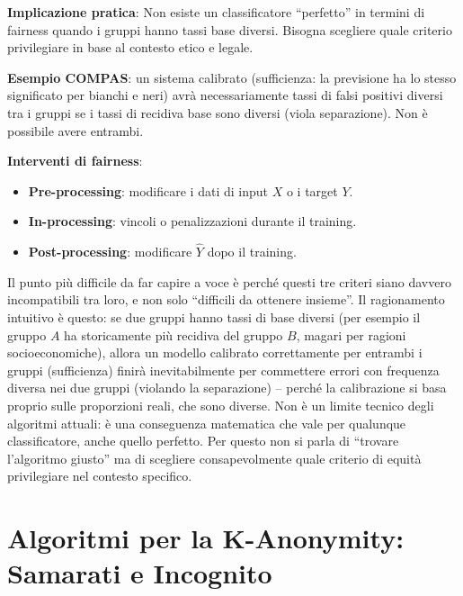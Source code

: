 \documentclass[a4paper,11pt]{article}
\begin{document}
\textbf{Implicazione pratica}: Non esiste un classificatore ``perfetto'' in termini di fairness quando i gruppi hanno tassi base diversi. Bisogna scegliere quale criterio privilegiare in base al contesto etico e legale.

\textbf{Esempio COMPAS}: un sistema calibrato (sufficienza: la previsione ha lo stesso significato per bianchi e neri) avr\`{a} necessariamente tassi di falsi positivi diversi tra i gruppi se i tassi di recidiva base sono diversi (viola separazione). Non \`{e} possibile avere entrambi.

\textbf{Interventi di fairness}:
\begin{itemize}
  \item \textbf{Pre-processing}: modificare i dati di input $X$ o i target $Y$.
  \item \textbf{In-processing}: vincoli o penalizzazioni durante il training.
  \item \textbf{Post-processing}: modificare $\hat{Y}$ dopo il training.
\end{itemize}

\begin{nota}
Il punto pi\`{u} difficile da far capire a voce \`{e} perch\'{e} questi tre criteri siano davvero incompatibili tra loro, e non solo ``difficili da ottenere insieme''. Il ragionamento intuitivo \`{e} questo: se due gruppi hanno tassi di base diversi (per esempio il gruppo $A$ ha storicamente pi\`{u} recidiva del gruppo $B$, magari per ragioni socioeconomiche), allora un modello calibrato correttamente per entrambi i gruppi (sufficienza) finir\`{a} inevitabilmente per commettere errori con frequenza diversa nei due gruppi (violando la separazione) -- perch\'{e} la calibrazione si basa proprio sulle proporzioni reali, che sono diverse. Non \`{e} un limite tecnico degli algoritmi attuali: \`{e} una conseguenza matematica che vale per qualunque classificatore, anche quello perfetto. Per questo non si parla di ``trovare l'algoritmo giusto'' ma di scegliere consapevolmente quale criterio di equit\`{a} privilegiare nel contesto specifico.
\end{nota}

\section{Algoritmi per la K-Anonymity: Samarati e Incognito}
\end{document}
